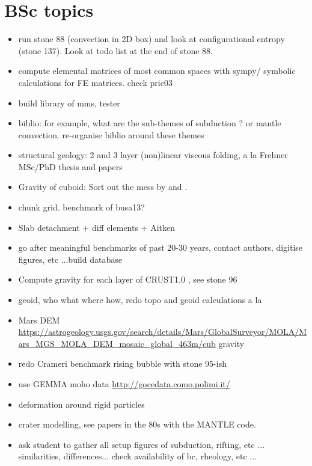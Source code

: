 \documentclass[a4paper]{article}
\begin{document}
\newpage
\section{BSc topics}

\begin{itemize}
\item run stone 88 (convection in 2D box) and look at configurational entropy 
(stone 137). Look at todo list at the end of stone 88.
\item compute elemental matrices of most common spaces with sympy/ symbolic calculations for FE matrices.
      check pric03
\item build library of mms, tester
\item biblio: for example, what are the sub-themes of subduction ? 
or mantle convection. re-organise biblio around these themes
\item structural geology: 2 and 3 layer (non)linear viscous folding, a la Frehner MSc/PhD thesis and papers 
\item Gravity of cuboid: Sort out the mess by \textcite{duti16} and \textcite{zhhu17}.
\item chunk grid. benchmark of busa13?
\item Slab detachment + diff elements + Aitken
\item go after meaningful benchmarks of past 20-30 years, contact authors, digitise figures, etc ...build database
\item Compute gravity for each layer of CRUST1.0 , see stone 96
\item geoid, who what where how, redo topo and geoid calculations a la \cite{king09}
\item Mars DEM \url{https://astrogeology.usgs.gov/search/details/Mars/GlobalSurveyor/MOLA/Mars_MGS_MOLA_DEM_mosaic_global_463m/cub} gravity
\item redo Crameri benchmark rising bubble with stone 95-ish
\item use GEMMA moho data \url{http://gocedata.como.polimi.it/} \cite{resa15} 
\item deformation around rigid particles 
\item crater modelling, see papers in the 80s with the MANTLE code.
\item ask student to gather all setup figures of subduction, rifting, etc ... similarities, differences... 
check availability of bc, rheology, etc ...
\end{itemize}
\end{document}
